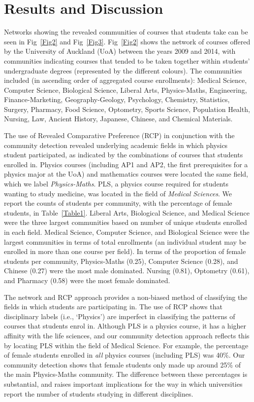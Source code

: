 \section{Results and Discussion}
Networks showing the revealed communities of courses that students take can be seen in Fig~\ref{Fig2} and Fig~\ref{Fig3}. Fig~\ref{Fig2} shows the network of courses offered by the University of Auckland (UoA) between the years 2009 and 2014, with communities indicating courses that tended to be taken together within students' undergraduate degrees (represented by the different colours). The communities included (in ascending order of aggregated course enrollments): Medical Science, Computer Science, Biological Science, Liberal Arts, Physics-Maths, Engineering, Finance-Marketing, Geography-Geology, Psychology, Chemistry, Statistics, Surgery, Pharmacy, Food Science, Optometry, Sports Science, Population Health, Nursing, Law, Ancient History, Japanese, Chinese, and Chemical Materials.

The use of Revealed Comparative Preference (RCP) in conjunction with the community detection revealed underlying academic fields in which physics student participated, as indicated by the combinations of courses that students enrolled in. Physics courses (including AP1 and AP2, the first prerequisites for a physics major at the UoA) and mathematics courses were located the same field, which we label \textit{Physics-Maths}. PLS, a physics course required for students wanting to study medicine, was located in the field of \textit{Medical Sciences}. We report the counts of students per community, with the percentage of female students, in Table~\ref{Table1}. Liberal Arts, Biological Science, and Medical Science were the three largest communities based on number of unique students enrolled in each field. Medical Science, Computer Science, and Biological Science were the largest communities in terms of total enrollments (an individual student may be enrolled in more than one course per field). In terms of the proportion of female students per community, Physics-Maths (0.25), Computer Science (0.28), and Chinese (0.27) were the most male dominated. Nursing (0.81), Optometry (0.61), and Pharmacy (0.58) were the most female dominated. 

The network and RCP approach provides a non-biased method of classifying the fields in which students are participating in. The use of RCP shows that disciplinary labels (i.e., `Physics') are imperfect in classifying the patterns of courses that students enrol in. Although PLS is a physics course, it has a higher affinity with the life sciences, and our community detection approach reflects this by locating PLS within the field of Medical Science. For example, the percentage of female students enrolled in \textit{all} physics courses (including PLS) was 40\%. Our community detection shows that female students only made up around 25\% of the main Physics-Maths community. The difference between these percentages is substantial, and raises important implications for the way in which universities report the number of students studying in different disciplines.

